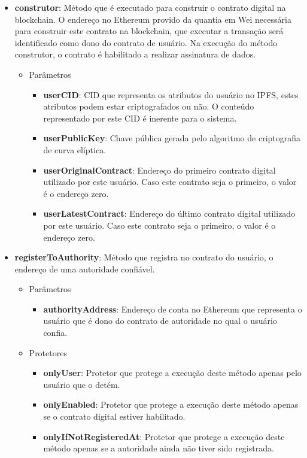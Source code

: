 \documentclass[tcc,capa]{texufpel}
\begin{document}
    \begin{itemize}
        \item \textbf{construtor}: Método que é executado para construir o contrato digital na blockchain. O endereço no Ethereum provido da quantia em Wei necessária para construir este contrato na blockchain, que executar a transação será identificado como dono do contrato de usuário. Na execução do método construtor, o contrato é habilitado a realizar assinatura de dados.
        \begin{itemize}
            \item Parâmetros
            \begin{itemize}
                \item \textbf{userCID}: CID que representa os atributos do usuário no IPFS, estes atributos podem estar criptografados ou não. O conteúdo representado por este CID é inerente para o sistema.
                \item \textbf{userPublicKey}: Chave pública gerada pelo algoritmo de criptografia de curva elíptica.
                \item \textbf{userOriginalContract}: Endereço do primeiro contrato digital utilizado por este usuário. Caso este contrato seja o primeiro, o valor é o endereço zero.
                \item \textbf{userLatestContract}: Endereço do último contrato digital utilizado por este usuário. Caso este contrato seja o primeiro, o valor é o endereço zero.
            \end{itemize}
        \end{itemize}
        
        \item \textbf{registerToAuthority}: Método que registra no contrato do usuário, o endereço de uma autoridade confiável.
        \begin{itemize}
            \item Parâmetros
            \begin{itemize}
                \item \textbf{authorityAddress}: Endereço de conta no Ethereum que representa o usuário que é dono do contrato de autoridade no qual o usuário confia.
            \end{itemize}
            \item Protetores
            \begin{itemize}
                \item \textbf{onlyUser}: Protetor que protege a execução deste método apenas pelo usuário que o detém.
                \item \textbf{onlyEnabled}: Protetor que protege a execução deste método apenas se o contrato digital estiver habilitado.
                \item \textbf{onlyIfNotRegisteredAt}: Protetor que protege a execução deste método apenas se a autoridade ainda não tiver sido registrada.
            \end{itemize}
        \end{itemize}
        

\end{itemize}
\end{document}
